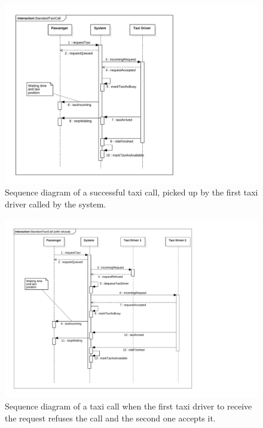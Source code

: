 \begin{figure}
	\includegraphics[width=\textwidth]{diagrams/sequence_taxicall.pdf}
	\caption{Sequence diagram of a successful taxi call, picked up by the first taxi driver called by the system.}
	\label{fig:sequence-taxicall}
\end{figure}

\begin{figure}
	\includegraphics[width=\textwidth]{diagrams/sequence_taxicall_refused.pdf}
	\caption{Sequence diagram of a taxi call when the first taxi driver to receive the request refuses the call and the second one accepts it.}
	\label{fig:sequence-taxicall-refused}
\end{figure}

